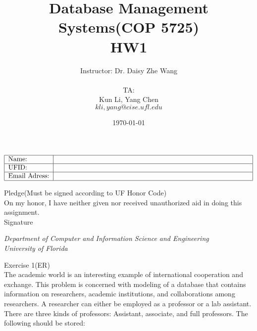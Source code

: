 \documentclass[12pt]{article}
\begin{document}

\title{Database Management Systems(COP 5725) \\ HW1}%
\author{Instructor: Dr. Daisy Zhe Wang\\\\
TA:\\ 
Kun Li, Yang Chen\\ 
${kli,yang}@cise.ufl.edu$\\
} %

\date{\today}
\maketitle


\begin {table}[h]
\[\begin{tabular}{|l|p{10cm}|} \hline
  Name: & \\ \hline
  UFID: & \\ \hline
  Email Adress: & \\ 
  \hline  
\end{tabular}\]
\end{table}

\linespread{2}
\noindent
Pledge(Must be signed according to UF Honor Code)\\
On my honor, I have neither given nor received unauthorized aid in doing this
assignment.\\

Signature \underline{\hspace{5cm}}

\null
\vfill
\begin{center}
\large \emph{Department of Computer and Information Science and Engineering}\\
\Large \emph{University of Florida}
\end{center}


\newpage
Exercise 1(ER)\\

The academic world is an interesting example of international cooperation and exchange.
This problem is concerned with modeling of a database that contains information on researchers, academic institutions, and collaborations among researchers. A researcher can
either be employed as a professor or a lab assistant. There are three kinds of professors:
Assistant, associate, and full professors. The following should be stored:
\end{document}
